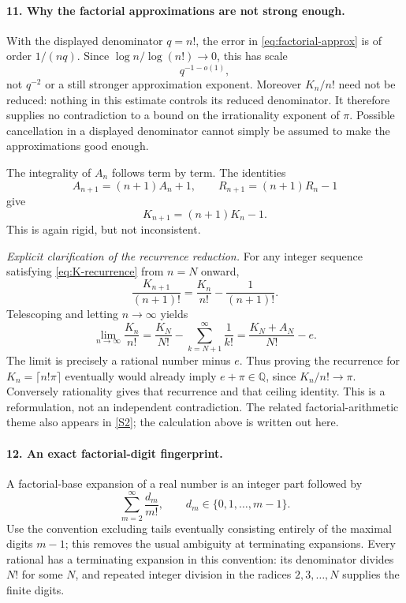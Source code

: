 \documentclass[11pt]{article}
\newcommand{\Q}{\mathbb Q}
\begin{document}
\paragraph{11. Why the factorial approximations are not strong enough.}
With the displayed denominator $q=n!$, the error in
\eqref{eq:factorial-approx} is of order $1/(nq)$. Since
$\log n/\log(n!)\to0$, this has scale
\[
 q^{-1-o(1)},
\]
not $q^{-2}$ or a still stronger approximation exponent. Moreover $K_n/n!$
need not be reduced: nothing in this estimate controls its reduced
denominator. It therefore supplies no contradiction to a bound on the
irrationality exponent of $\pi$. Possible cancellation in a displayed
denominator cannot simply be assumed to make the approximations good
enough.

The integrality of $A_n$ follows term by term. The identities
\[
 A_{n+1}=(n+1)A_n+1,\qquad
 R_{n+1}=(n+1)R_n-1
\]
give
\begin{equation}\label{eq:K-recurrence}
 \boxed{K_{n+1}=(n+1)K_n-1.}
\end{equation}
This is again rigid, but not inconsistent.

\textit{Explicit clarification of the recurrence reduction.}
For any integer sequence satisfying \eqref{eq:K-recurrence} from $n=N$
onward,
\[
 \frac{K_{n+1}}{(n+1)!}=\frac{K_n}{n!}-\frac1{(n+1)!}.
\]
Telescoping and letting $n\to\infty$ yields
\begin{equation}\label{eq:recurrence-limit}
 \lim_{n\to\infty}\frac{K_n}{n!}
 =\frac{K_N}{N!}-\sum_{k=N+1}^{\infty}\frac1{k!}
 =\frac{K_N+A_N}{N!}-e.
\end{equation}
The limit is precisely a rational number minus $e$. Thus proving the
recurrence for $K_n=\lceil n!\pi\rceil$ eventually would already imply
$e+\pi\in\Q$, since $K_n/n!\to\pi$. Conversely rationality gives that
recurrence and that ceiling identity. This is a reformulation, not an
independent contradiction. The related factorial-arithmetic theme also
appears in \href{https://arxiv.org/abs/2606.17303}{[S2]}; the calculation
above is written out here.

\paragraph{12. An exact factorial-digit fingerprint.}
A factorial-base expansion of a real number is an integer part followed by
\[
 \sum_{m=2}^{\infty}\frac{d_m}{m!},\qquad
 d_m\in\{0,1,\ldots,m-1\}.
\]
Use the convention excluding tails eventually consisting entirely of the
maximal digits $m-1$; this removes the usual ambiguity at terminating
expansions. Every rational has a terminating expansion in this convention:
its denominator divides $N!$ for some $N$, and repeated integer division
in the radices $2,3,\ldots,N$ supplies the finite digits.
\end{document}

